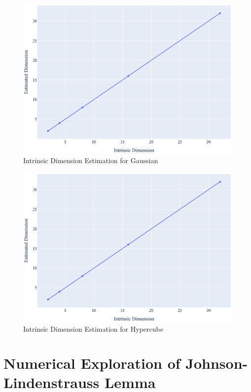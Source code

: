 \documentclass{article}
\begin{document}
    \begin{figure}[h]
        \label{fig:gaussian_intrinsic_dim} 
        \includegraphics[width=\linewidth]{images/q5/gaussian.png}
        \caption{Intrinsic Dimension Estimation for Gaussian}
    \end{figure}

    \begin{figure}[h]
        \label{fig:hypercube_intrinsic_dim} 
        \includegraphics[width=\linewidth]{images/q5/hypercube.png}
        \caption{Intrinsic Dimension Estimation for Hypercube}
    \end{figure}

    \clearpage

\section{Numerical Exploration of Johnson-Lindenstrauss Lemma}
\end{document}
